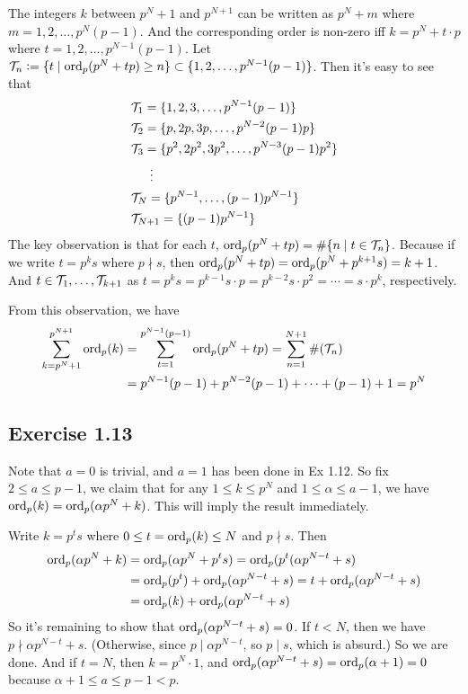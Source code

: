 \documentclass[../Koblitz.tex]{subfiles}
\begin{document}
The integers $k$ between $p^N+1$ and $p^{N+1}$ can be written as $p^N+m$ where $m=1,2,\ldots,p^N(p-1)$. And the corresponding order is non-zero iff $k=p^N+t\cdot p$ where $t=1,2,\ldots,p^{N-1}(p-1)$. Let $\mathcal{T}_n :=\{ t \mid \operatorname{ord}_p(p^N+tp) \geq n\} \subset \{1,2,\ldots,p^{N-1}(p-1)\}$. Then it's easy to see that
\begin{align*}
&\mathcal{T}_1 = \{1,2,3,\ldots,p^{N-1}(p-1)\} \\
&\mathcal{T}_2 = \{p,2p,3p,\ldots,p^{N-2}(p-1)p\} \\
&\mathcal{T}_3 = \{p^2,2p^2,3p^2,\ldots,p^{N-3}(p-1)p^2\} \\
&\quad\; \: \vdots \\
&\mathcal{T}_N = \{p^{N-1},\ldots,(p-1)p^{N-1}\} \\
&\mathcal{T}_{N+1} = \{(p-1)p^{N-1}\}
\end{align*}
The key observation is that for each $t$, $\operatorname{ord}_p(p^N+tp) = \#\{n\mid t\in\mathcal{T}_n\}$. Because if we write $t=p^ks$ where $p\nmid s$, then $\operatorname{ord}_p(p^N+tp)=\operatorname{ord}_p(p^N+p^{k+1}s)=k+1$. And $t\in\mathcal{T}_1,\ldots,\mathcal{T}_{k+1}$ as $t=p^ks=p^{k-1}s\cdot p=p^{k-2}s\cdot p^2=\cdots=s\cdot p^k$, respectively.

From this observation, we have 
\begin{align*}
\sum_{k=p^N+1}^{p^{N+1}} \operatorname{ord}_p (k) &= \sum_{t=1}^{p^{N-1}(p-1)} \operatorname{ord}_p(p^N+tp) = \sum_{n=1}^{N+1} \#(\mathcal{T}_n) \\
&= p^{N-1}(p-1) + p^{N-2}(p-1) + \cdots + (p-1) + 1 = p^N
\end{align*}

\subsection*{Exercise 1.13}

Note that $a=0$ is trivial, and $a=1$ has been done in Ex 1.12. So fix $2\leq a\leq p-1$, we claim that for any $1\leq k\leq p^N$ and $1\leq\alpha\leq a-1$, we have $\operatorname{ord}_p(k)=\operatorname{ord}_p(\alpha p^N+k)$. This will imply the result immediately.

Write $k=p^ts$ where $0\leq t=\operatorname{ord}_p(k)\leq N$ and $p\nmid s$. Then
\begin{align*}
\operatorname{ord}_p(\alpha p^N+k) &= \operatorname{ord}_p(\alpha p^N+p^ts) = \operatorname{ord}_p(p^t(\alpha p^{N-t}+s) \\
&= \operatorname{ord}_p(p^t) + \operatorname{ord}_p(\alpha p^{N-t}+s) = t + \operatorname{ord}_p(\alpha p^{N-t}+s) \\
&= \operatorname{ord}_p(k) +  \operatorname{ord}_p(\alpha p^{N-t}+s)
\end{align*}
So it's remaining to show that $\operatorname{ord}_p(\alpha p^{N-t}+s)=0$. If $t<N$, then we have $p\nmid \alpha p^{N-t}+s$. (Otherwise, since $p\mid \alpha p^{N-t}$, so $p\mid s$, which is absurd.) So we are done. And if $t=N$, then $k=p^N\cdot1$, and $\operatorname{ord}_p(\alpha p^{N-t}+s) = \operatorname{ord}_p(\alpha+1)=0$ because $\alpha+1\leq a\leq p-1<p$.
\end{document}
